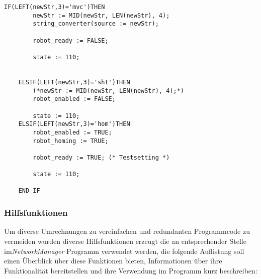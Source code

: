 \begin{lstlisting}[language = codesysls, captionpos=b, caption={Ermittlung der durchzuführenden Operation}]
IF(LEFT(newStr,3)='mvc')THEN
		newStr := MID(newStr, LEN(newStr), 4);
		string_converter(source := newStr);

		robot_ready := FALSE;

		state := 110;


	ELSIF(LEFT(newStr,3)='sht')THEN
		(*newStr := MID(newStr, LEN(newStr), 4);*)
		robot_enabled := FALSE;

		state := 110;
	ELSIF(LEFT(newStr,3)='hom')THEN
		robot_enabled := TRUE;
		robot_homing := TRUE;

		robot_ready := TRUE; (* Testsetting *)

		state := 110;

	END_IF
\end{lstlisting}

\subsubsection{Hilfsfunktionen}
Um diverse Umrechnungen zu vereinfachen und redundanten Programmcode zu vermeiden wurden diverse Hilfsfunktionen erzeugt die an entsprechender Stelle im\textit{NetworkManager} Programm verwendet werden, die folgende Auflistung soll einen Überblick über diese Funktionen bieten, Informationen über ihre Funktionalität bereitstellen und ihre Verwendung im Programm kurz beschreiben:


